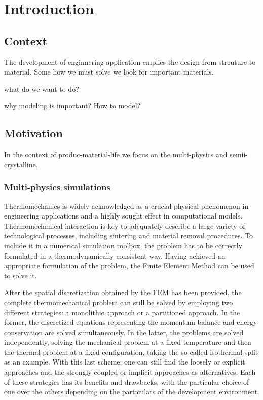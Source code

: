 \chapter{Introduction}

\section{Context}

The development of enginnering application emplies the design
from strcuture to material.
Some how we must solve
we look for important materials.

what do we want to do?

why modeling is important?
How to model?

\section{Motivation}

In the context of produc-material-life we focus on the multi-physics and semii-crystalline.

\subsection{Multi-physics simulations}

Thermomechanics is widely acknowledged as a crucial physical phenomenon in engineering applications and a highly sought effect in computational models.
Thermomechanical interaction is key to adequately describe a large variety of technological processes, including sintering and material removal procedures.
To include it in a numerical simulation toolbox, the problem has to be correctly formulated in a thermodynamically consistent way.
Having achieved an appropriate formulation of the problem, the Finite Element Method can be used to solve it.

After the spatial discretization obtained by the FEM has been provided, the complete thermomechanical problem can still be solved by employing two different strategies: a monolithic approach or a partitioned approach.
In the former, the discretized equations representing the momentum balance and energy conservation are solved simultaneously.
In the latter, the problems are solved independently, solving the mechanical problem at a fixed temperature and then the thermal problem at a fixed configuration, taking the so-called isothermal split as an example.
With this last scheme, one can still find the loosely or explicit approaches and the strongly coupled or implicit approaches as alternatives.
Each of these strategies has its benefits and drawbacks, with the particular choice of one over the others depending on the particulars of the development environment.

